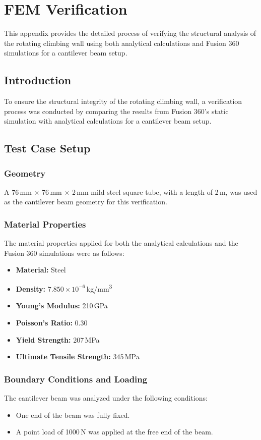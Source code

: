 \chapter{FEM Verification}
\label{appx:FEM-verification}

This appendix provides the detailed process of verifying the structural analysis of the rotating climbing wall using both analytical calculations and Fusion 360 simulations for a cantilever beam setup.

\section{Introduction}
To ensure the structural integrity of the rotating climbing wall, a verification process was conducted by comparing the results from Fusion 360's static simulation with analytical calculations for a cantilever beam setup.

\section{Test Case Setup}
\subsection{Geometry}
A 76\,mm $\times$ 76\,mm $\times$ 2\,mm mild steel square tube, with a length of 2\,m, was used as the cantilever beam geometry for this verification.

\subsection{Material Properties}
The material properties applied for both the analytical calculations and the Fusion 360 simulations were as follows:
\begin{itemize}
    \item \textbf{Material:} Steel
    \item \textbf{Density:} $7.850 \times 10^{-6}$\,kg/mm\textsuperscript{3}
    \item \textbf{Young's Modulus:} 210\,GPa
    \item \textbf{Poisson's Ratio:} 0.30
    \item \textbf{Yield Strength:} 207\,MPa
    \item \textbf{Ultimate Tensile Strength:} 345\,MPa
\end{itemize}

\subsection{Boundary Conditions and Loading}
The cantilever beam was analyzed under the following conditions:
\begin{itemize}
    \item One end of the beam was fully fixed.
    \item A point load of 1000\,N was applied at the free end of the beam.
\end{itemize}

